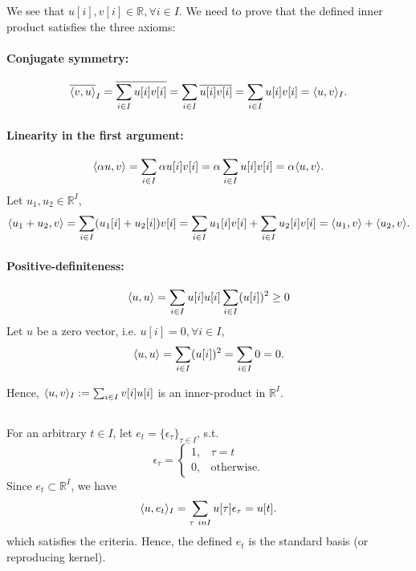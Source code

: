 \subsection{}\label{subsec:p4-d}


\subsection{}\label{subsec:p4-e}
We see that $u[i], v[i] \in \mathbb{R}, \forall i \in I$. We need to prove that the defined inner product satisfies the three axioms:

\paragraph{Conjugate symmetry:}
\[\overline{\langle v, u \rangle}_I = \overline{\sum_{i \in I} u[i]v[i]} = \sum_{i \in I} \overline{u[i]v[i]} = \sum_{i \in I} u[i]v[i] = \langle u, v \rangle_I.\]

\paragraph{Linearity in the first argument:}
\[\langle \alpha u, v \rangle = \sum_{i \in I} \alpha u[i]v[i] = \alpha \sum_{i \in I} u[i]v[i] = \alpha \langle u, v \rangle.\]
Let $u_1, u_2 \in \mathbb{R}^I$,
\[\langle u_1+u_2, v \rangle = \sum_{i \in I} (u_1[i]+u_2[i])v[i] = \sum_{i \in I} u_1[i]v[i] + \sum_{i \in I} u_2[i]v[i] = \langle u_1, v \rangle + \langle u_2, v \rangle.\]

\paragraph{Positive-definiteness:}
\[\langle u, u \rangle = \sum_{i \in I} u[i]u[i] \sum_{i \in I} (u[i])^2 \geq 0\]
Let $u$ be a zero vector, i.e. $u[i] = 0, \forall i \in I$,
\[\langle u, u \rangle = \sum_{i \in I} (u[i])^2 = \sum_{i \in I} 0 = 0.\]

Hence, $\langle u, v \rangle_I := \sum_{i \in I} v[i]u[i]$ is an inner-product in $\mathbb{R}^I$.

\subsection{}\label{subsec:p4-f}
For an arbitrary $t \in I$, let $e_t = \{\epsilon_\tau\}_{\tau \in I}$, s.t.
\[
\epsilon_\tau = \begin{cases}
1, &\tau = t\\
0, &\text{otherwise}.
\end{cases}
\]
Since $e_t \subset \mathbb{R}^I$, we have
\[\innerprod{u}{e_t}_I = \sum_{\tau \ in I} u[\tau] \epsilon_\tau = u[t].\]
which satisfies the criteria. Hence, the defined $e_t$ is the standard basis (or reproducing kernel).
